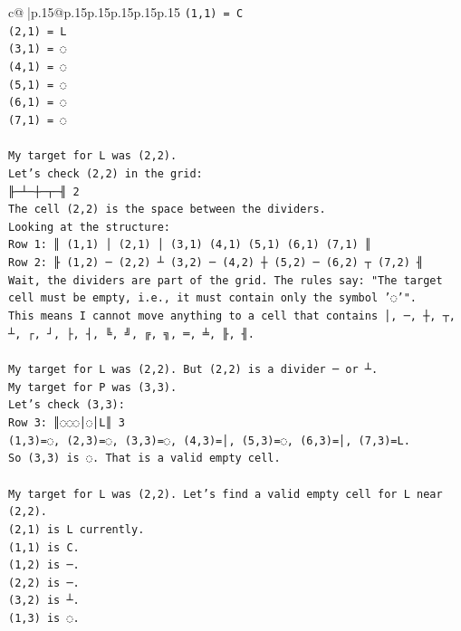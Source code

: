 \documentclass{article}
\begin{document}
{\begin{supertabular}{c@{$\;$}|p{.15\linewidth}@{}p{.15\linewidth}p{.15\linewidth}p{.15\linewidth}p{.15\linewidth}p{.15\linewidth}}
{{{\texttt{(1,1) = C} \\
\texttt{(2,1) = L} \\
\texttt{(3,1) = ◌} \\
\texttt{(4,1) = ◌} \\
\texttt{(5,1) = ◌} \\
\texttt{(6,1) = ◌} \\
\texttt{(7,1) = ◌} \\
\\ 
\texttt{My target for L was (2,2).} \\
\texttt{Let's check (2,2) in the grid:} \\
\texttt{╟─┴─┼─┬─╢ 2} \\
\texttt{The cell (2,2) is the space between the dividers.} \\
\texttt{Looking at the structure:} \\
\texttt{Row 1: ║ (1,1) │ (2,1) │ (3,1) (4,1) (5,1) (6,1) (7,1) ║} \\
\texttt{Row 2: ╟ (1,2) ─ (2,2) ┴ (3,2) ─ (4,2) ┼ (5,2) ─ (6,2) ┬ (7,2) ╢} \\
\texttt{Wait, the dividers are part of the grid. The rules say: "The target cell must be empty, i.e., it must contain only the symbol '◌'".} \\
\texttt{This means I cannot move anything to a cell that contains │, ─, ┼, ┬, ┴, ┌, ┘, ├, ┤, ╚, ╝, ╔, ╗, ═, ╧, ╟, ╢.} \\
\\ 
\texttt{My target for L was (2,2). But (2,2) is a divider ─ or ┴.} \\
\texttt{My target for P was (3,3).} \\
\texttt{Let's check (3,3):} \\
\texttt{Row 3: ║◌◌◌│◌│L║ 3} \\
\texttt{(1,3)=◌, (2,3)=◌, (3,3)=◌, (4,3)=│, (5,3)=◌, (6,3)=│, (7,3)=L.} \\
\texttt{So (3,3) is ◌. That is a valid empty cell.} \\
\\ 
\texttt{My target for L was (2,2). Let's find a valid empty cell for L near (2,2).} \\
\texttt{(2,1) is L currently.} \\
\texttt{(1,1) is C.} \\
\texttt{(1,2) is ─.} \\
\texttt{(2,2) is ─.} \\
\texttt{(3,2) is ┴.} \\
\texttt{(1,3) is ◌.} \\
}}}
\end{supertabular}}
\end{document}
